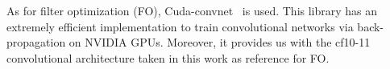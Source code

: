 As for filter optimization (FO), Cuda-convnet~\cite{Krizhevsky:cuda-convnet:2012} is used. This library has an extremely efficient implementation to train convolutional networks via back-propagation on NVIDIA GPUs. 
Moreover, it provides us with the cf10-11 convolutional architecture taken in this work as reference for FO.
